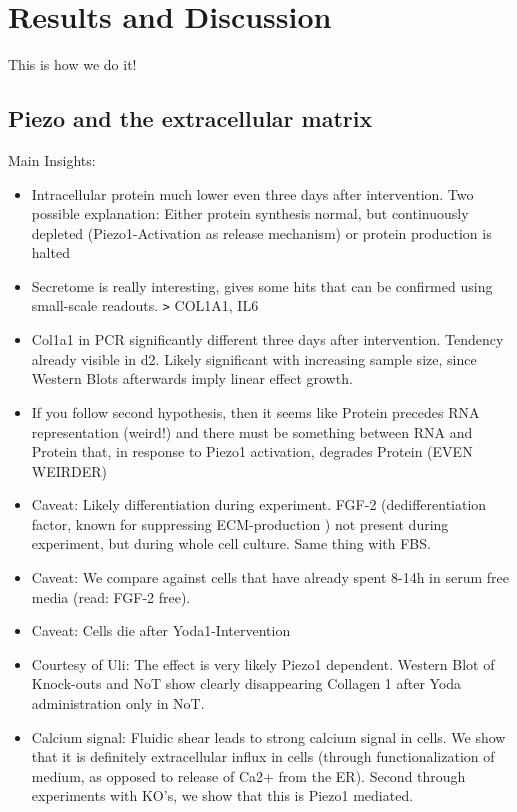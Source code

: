 \chapter{Results and Discussion}

This is how we do it! 
\section{Piezo and the extracellular matrix}

Main Insights:
\begin{itemize}
    \item Intracellular protein much lower even three days after intervention. Two possible explanation: Either protein synthesis normal, but continuously depleted (Piezo1-Activation as release mechanism)  or protein production is halted
    
    \item Secretome is really interesting, gives some hits that can be confirmed using small-scale readouts. \texttt{>} COL1A1, IL6
    
    \item Col1a1 in PCR significantly different three days after intervention. Tendency already visible in d2. Likely significant with increasing sample size, since Western Blots afterwards imply linear effect growth.
    
    \item If you follow second hypothesis, then it seems like Protein precedes RNA representation (weird!) and there must be something between RNA and Protein that, in response to Piezo1 activation, degrades Protein (EVEN WEIRDER)
    
     \item  Caveat: Likely differentiation during experiment. FGF-2 (dedifferentiation factor, known for suppressing ECM-production ) not present during experiment, but during whole cell culture. Same thing with FBS. 
     
    \item Caveat: We compare against cells that have already spent 8-14h in serum free media (read: FGF-2 free).    
    
    \item Caveat: Cells die after Yoda1-Intervention
    
    \item Courtesy of Uli: The effect is very likely Piezo1 dependent. Western Blot of Knock-outs and NoT show clearly disappearing Collagen 1 after Yoda administration only in NoT. 
    
    \item Calcium signal: Fluidic shear leads to strong calcium signal in cells. We show that it is definitely extracellular influx in cells (through functionalization of medium, as opposed to release of Ca2+ from the ER). Second through experiments with KO's, we show that this is Piezo1 mediated. 
\end{itemize}

